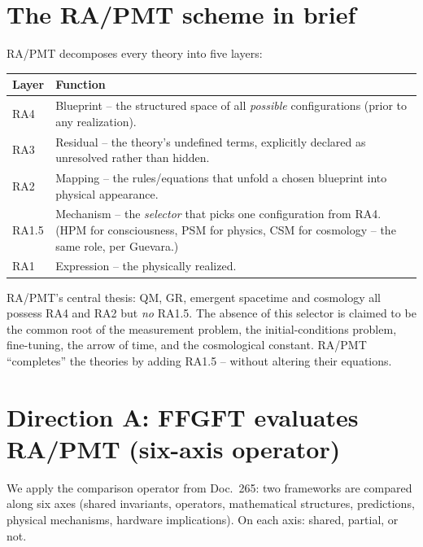 \section{The RA/PMT scheme in brief}

RA/PMT decomposes every theory into five layers:

\begin{center}
\begin{tabular}{p{2.2cm}p{9.5cm}}
\toprule
\textbf{Layer} & \textbf{Function} \\
\midrule
RA4 & Blueprint -- the structured space of all \emph{possible}
      configurations (prior to any realization). \\
\addlinespace
RA3 & Residual -- the theory's undefined terms, explicitly declared as
      unresolved rather than hidden. \\
\addlinespace
RA2 & Mapping -- the rules/equations that unfold a chosen blueprint into
      physical appearance. \\
\addlinespace
RA1.5 & Mechanism -- the \emph{selector} that picks one configuration
      from RA4. (HPM for consciousness, PSM for physics, CSM for
      cosmology -- the same role, per Guevara.) \\
\addlinespace
RA1 & Expression -- the physically realized. \\
\bottomrule
\end{tabular}
\end{center}

RA/PMT's central thesis: QM, GR, emergent spacetime and cosmology all
possess RA4 and RA2 but \emph{no} RA1.5. The absence of this selector is
claimed to be the common root of the measurement problem, the
initial-conditions problem, fine-tuning, the arrow of time, and the
cosmological constant. RA/PMT ``completes'' the theories by adding RA1.5 --
without altering their equations.

\section{Direction A: FFGFT evaluates RA/PMT (six-axis operator)}

We apply the comparison operator from Doc.~265: two frameworks are
compared along six axes (shared invariants, operators, mathematical
structures, predictions, physical mechanisms, hardware implications).
On each axis: shared, partial, or not.

